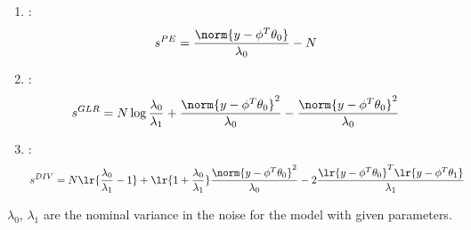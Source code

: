 \begin{enumerate}
        \item {} \cite{segen1980detecting}:
        \begin{align}
                s^{PE} &= \frac{\norm{y - \phi^T \theta_0}}{\lambda_0} - N
        \end{align}
        \item {} \cite{appel1983adaptive}:
        \begin{align}
                s^{GLR} &= N \log \frac{\lambda_0}{\lambda_1} + \frac{\norm{y - \phi^T \theta_0}^2}{\lambda_0}
                                                                - \frac{\norm{y - \phi^T \theta_0}^2}{\lambda_0}
        \end{align}
        \item {}\cite{kumamaru1996robust}:
        \begin{align}
                s^{DIV} &= N \lr{\frac{\lambda_0}{\lambda_1} - 1}
                                + \lr{1 + \frac{\lambda_0}{\lambda_1}} \frac{\norm{y - \phi^T \theta_0}^2}{\lambda_0}
                                - 2 \frac{\lr{y - \phi^T \theta_0}^T \lr{y - \phi^T \theta_1}}{\lambda_1}
        \end{align}
\end{enumerate}
$\lambda_0$, $\lambda_1$ are the nominal variance in the noise for the model with given parameters.
